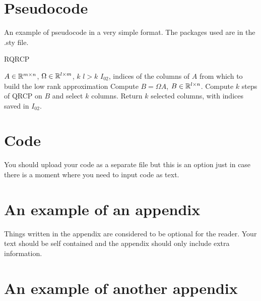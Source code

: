 \documentclass{article}
\begin{document}
\section{Pseudocode}

An example of pseudocode in a very simple format. The packages used are in the .sty file.

\begin{algorithm}
\caption{RQRCP}\label{RQRCP}
\begin{algorithmic}
\Input $A \in {\ensuremath{\mathbb{R}}}^{m \times n}$, $\Omega \in {\ensuremath{\mathbb{R}}}^{l \times m}$, $k$ $l > k$
\Output $I_{02}$, indices of the columns of $A$ from which to build the low rank approximation
\State Compute $B = \Omega A$, $B \in {\ensuremath{\mathbb{R}}}^{l \times n}$.
\State Compute $k$ steps of QRCP on $B$ and select $k$ columns.
\State Return $k$ selected columns, with indices saved in $I_{02}$.
\end{algorithmic}
\end{algorithm}

\section{Code}

You should upload your code as a separate file but this is an option just in case there is a moment where you need to input code as text. 







\appendix
\section{An example of an appendix}

Things written in the appendix are considered to be optional for the reader. Your text should be self contained and the appendix should only include extra information.


\section{An example of another appendix}
\end{document}

